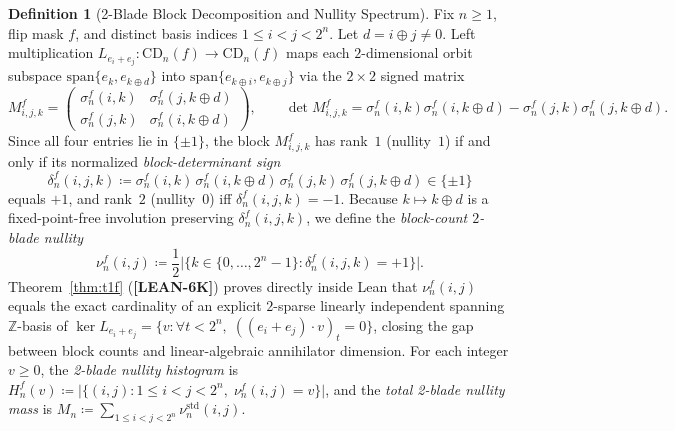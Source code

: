 \documentclass[11pt,reqno]{amsart}
\theoremstyle{plain}
\theoremstyle{definition}
\newtheorem{definition}[theorem]{Definition}
\theoremstyle{remark}
\newcommand{\tagLean}{\mbox{\textsf{\textbf{\color{oiBlue}[LEAN-6K]}}}}
\newcommand{\CD}{\mathrm{CD}}
\newcommand{\Z}{\mathbb{Z}}
\newcommand{\std}{\mathrm{std}}
\begin{document}
\begin{definition}[2-Blade Block Decomposition and Nullity Spectrum]
\label{def:twoblade}
Fix $n \ge 1$, flip mask $f$, and distinct basis indices $1 \le i < j < 2^n$. Let
$d = i \oplus j \neq 0$. Left multiplication $L_{e_i + e_j} : \CD_n(f) \to \CD_n(f)$ maps each
$2$-dimensional orbit subspace $\mathrm{span}\{e_k, e_{k \oplus d}\}$ into
$\mathrm{span}\{e_{k \oplus i}, e_{k \oplus j}\}$ via the $2 \times 2$ signed matrix
\begin{equation}
  M_{i,j,k}^{f} =
  \begin{pmatrix}
    \sigma_n^{f}(i, k) & \sigma_n^{f}(j, k \oplus d) \\
    \sigma_n^{f}(j, k) & \sigma_n^{f}(i, k \oplus d)
  \end{pmatrix},
  \qquad
  \det M_{i,j,k}^{f} = \sigma_n^{f}(i, k)\sigma_n^{f}(i, k\oplus d) - \sigma_n^{f}(j, k)\sigma_n^{f}(j, k\oplus d).
\end{equation}
Since all four entries lie in $\{\pm 1\}$, the block $M_{i,j,k}^{f}$ has rank~$1$ (nullity~$1$)
if and only if its normalized \emph{block-determinant sign}
\begin{equation}
\label{eq:block_delta}
  \delta_n^{f}(i, j, k) \coloneqq
  \sigma_n^{f}(i, k)\,\sigma_n^{f}(i, k \oplus d)\,
  \sigma_n^{f}(j, k)\,\sigma_n^{f}(j, k \oplus d) \in \{\pm 1\}
\end{equation}
equals $+1$, and rank~$2$ (nullity~$0$) iff $\delta_n^{f}(i, j, k) = -1$. Because
$k \mapsto k \oplus d$ is a fixed-point-free involution preserving $\delta_n^{f}(i,j,k)$, we define
the \emph{block-count $2$-blade nullity}
\begin{equation}
  \nu_n^{f}(i, j)
  \coloneqq \frac{1}{2} \bigl|\{k \in \{0, \dots, 2^n-1\} : \delta_n^{f}(i, j, k) = +1\}\bigr|.
\end{equation}
Theorem~\ref{thm:t1f} (\tagLean) proves directly inside Lean that $\nu_n^{f}(i, j)$ equals the
exact cardinality of an explicit $2$-sparse linearly independent spanning $\Z$-basis of
$\ker L_{e_i + e_j} = \{v : \forall t < 2^n,\; ((e_i+e_j) \cdot v)_t = 0\}$, closing the gap
between block counts and linear-algebraic annihilator dimension.
For each integer $v \ge 0$, the \emph{2-blade nullity histogram} is
$H_n^{f}(v) \coloneqq \bigl|\{(i, j) : 1 \le i < j < 2^n,\; \nu_n^{f}(i, j) = v\}\bigr|$,
and the \emph{total 2-blade nullity mass} is
$M_n \coloneqq \sum_{1 \le i < j < 2^n} \nu_n^{\std}(i, j)$.
\end{definition}

\end{document}
